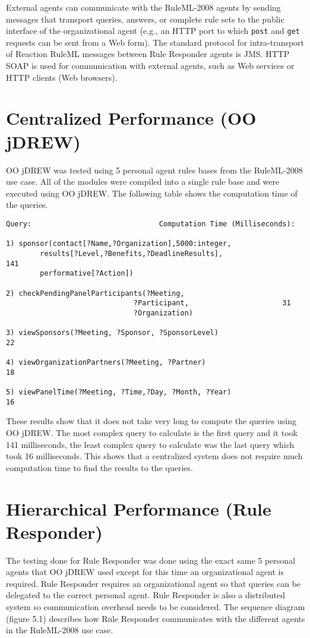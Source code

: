 \documentclass[12pt]{report}
\begin{document}
External agents can communicate with the RuleML-2008 agents by sending messages that transport queries, answers, or complete rule sets to the public interface of the organizational agent (e.g., an HTTP port to which \texttt{post} and \texttt{get} requests can be sent from a Web form).  The standard protocol for intra-transport of Reaction RuleML messages between Rule Responder agents is JMS.  HTTP SOAP is used for communication with external agents, such as Web services or HTTP clients (Web browsers).

\section{Centralized Performance (OO jDREW)}
OO jDREW was tested using 5 personal agent rules bases from the RuleML-2008 use case.  All of the modules were compiled into a single rule base and were executed using OO jDREW. The following table shows the computation time of the queries.

\singlespacing
\begin{verbatim}
Query:                              Computation Time (Milliseconds): 
                                             
1) sponsor(contact[?Name,?Organization],5000:integer,
        results[?Level,?Benefits,?DeadlineResults],      			   141
        performative[?Action])
        
2) checkPendingPanelParticipants(?Meeting,
                              ?Participant,            		     31
                              ?Organization)
                              
3) viewSponsors(?Meeting, ?Sponsor, ?SponsorLevel)          			22

4) viewOrganizationPartners(?Meeting, ?Partner)             			18

5) viewPanelTime(?Meeting, ?Time,?Day, ?Month, ?Year)       			16  
\end{verbatim}
\doublespacing
These results show that it does not take very long to compute the queries using OO jDREW.  The most complex query to calculate is the first query and it took 141 milliseconds, the least complex query to calculate was the last query which took 16 milliseconds.  This shows that a centralized system does not require much computation time to find the results to the queries.

\section{Hierarchical Performance (Rule Responder)}
The testing done for Rule Responder was done using the exact same 5 personal agents that OO jDREW used except for this time an organizational agent is required.  Rule Responder requires an organizational agent so that queries can be delegated to the correct personal agent.  Rule Responder is also a distributed system so communication overhead needs to be considered.  The sequence diagram (figure 5.1) describes how Rule Responder communicates with the different agents in the RuleML-2008 use case.
\end{document}
